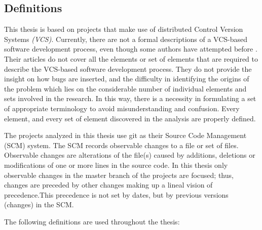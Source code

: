 \documentclass[a4paper, 12pt]{book}
\begin{document}

\subsection{Definitions}
\label{subsec:definitions}

This thesis is based on projects that make use of distributed Control Version Systems \emph{(VCS)}. Currently, there are not a formal descriptions of a VCS-based software development process, even though some authors have attempted before \cite{rosso2016purposes,brun2013early}. Their articles do not cover all the elements or set of elements that are required to describe the VCS-based software development process. They do not provide the insight on how bugs are inserted, and the difficulty in identifying the origins of the problem which lies on the considerable number of individual elements and sets involved in the research. In this way, there is a necessity in formulating a set of appropriate terminology to avoid misunderstanding and confusion. Every element, and every set of element discovered in the analysis are properly defined. 

The projects analyzed in this thesis use git as their Source Code Management (SCM) system. The SCM records observable changes to a file or set of files. Observable changes are alterations of the file(s) caused by additions, deletions or modifications of one or more lines in the source code. In this thesis only observable changes in the master branch of the projects are focused; thus, changes are preceded by other changes making up a lineal vision of precedence.This precedence is not set by dates, but by previous versions (changes) in the SCM. 

The following definitions are used throughout the thesis: 
\end{document}
